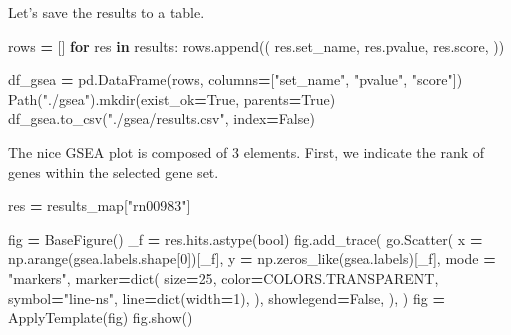 \documentclass[
]{book}
\newenvironment{Shaded}{\begin{snugshade}}{\end{snugshade}}
\newcommand{\BuiltInTok}[1]{#1}
\newcommand{\ControlFlowTok}[1]{\textcolor[rgb]{0.13,0.29,0.53}{\textbf{#1}}}
\newcommand{\DecValTok}[1]{\textcolor[rgb]{0.00,0.00,0.81}{#1}}
\newcommand{\KeywordTok}[1]{\textcolor[rgb]{0.13,0.29,0.53}{\textbf{#1}}}
\newcommand{\NormalTok}[1]{#1}
\newcommand{\OperatorTok}[1]{\textcolor[rgb]{0.81,0.36,0.00}{\textbf{#1}}}
\newcommand{\StringTok}[1]{\textcolor[rgb]{0.31,0.60,0.02}{#1}}
\newcommand{\VariableTok}[1]{\textcolor[rgb]{0.00,0.00,0.00}{#1}}
\begin{document}
Let's save the results to a table.

\begin{Shaded}
\begin{Highlighting}[numbers=left,,]
\NormalTok{rows }\OperatorTok{=}\NormalTok{ []}
\ControlFlowTok{for}\NormalTok{ res }\KeywordTok{in}\NormalTok{ results:}
\NormalTok{    rows.append((}
\NormalTok{        res.set\_name,}
\NormalTok{        res.pvalue,}
\NormalTok{        res.score,}
\NormalTok{    ))}

\NormalTok{df\_gsea }\OperatorTok{=}\NormalTok{ pd.DataFrame(rows, columns}\OperatorTok{=}\NormalTok{[}\StringTok{"set\_name"}\NormalTok{, }\StringTok{"pvalue"}\NormalTok{, }\StringTok{"score"}\NormalTok{])}
\NormalTok{Path(}\StringTok{"./gsea"}\NormalTok{).mkdir(exist\_ok}\OperatorTok{=}\VariableTok{True}\NormalTok{, parents}\OperatorTok{=}\VariableTok{True}\NormalTok{)}
\NormalTok{df\_gsea.to\_csv(}\StringTok{"./gsea/results.csv"}\NormalTok{, index}\OperatorTok{=}\VariableTok{False}\NormalTok{)}
\end{Highlighting}
\end{Shaded}

The nice GSEA plot is composed of 3 elements. First, we indicate the rank of genes within the selected gene set.

\begin{Shaded}
\begin{Highlighting}[numbers=left,,]
\NormalTok{res }\OperatorTok{=}\NormalTok{ results\_map[}\StringTok{"rn00983"}\NormalTok{]}

\NormalTok{fig }\OperatorTok{=}\NormalTok{ BaseFigure()}
\NormalTok{\_f }\OperatorTok{=}\NormalTok{ res.hits.astype(}\BuiltInTok{bool}\NormalTok{)}
\NormalTok{fig.add\_trace(}
\NormalTok{    go.Scatter(}
\NormalTok{        x }\OperatorTok{=}\NormalTok{ np.arange(gsea.labels.shape[}\DecValTok{0}\NormalTok{])[\_f],}
\NormalTok{        y }\OperatorTok{=}\NormalTok{ np.zeros\_like(gsea.labels)[\_f],}
\NormalTok{        mode }\OperatorTok{=} \StringTok{"markers"}\NormalTok{,}
\NormalTok{        marker}\OperatorTok{=}\BuiltInTok{dict}\NormalTok{(}
\NormalTok{            size}\OperatorTok{=}\DecValTok{25}\NormalTok{,}
\NormalTok{            color}\OperatorTok{=}\NormalTok{COLORS.TRANSPARENT,}
\NormalTok{            symbol}\OperatorTok{=}\StringTok{"line{-}ns"}\NormalTok{,}
\NormalTok{            line}\OperatorTok{=}\BuiltInTok{dict}\NormalTok{(width}\OperatorTok{=}\DecValTok{1}\NormalTok{),}
\NormalTok{        ),}
\NormalTok{        showlegend}\OperatorTok{=}\VariableTok{False}\NormalTok{,}
\NormalTok{    ),}
\NormalTok{)}
\NormalTok{fig }\OperatorTok{=}\NormalTok{ ApplyTemplate(fig)}
\NormalTok{fig.show()}
\end{Highlighting}
\end{Shaded}
\end{document}
